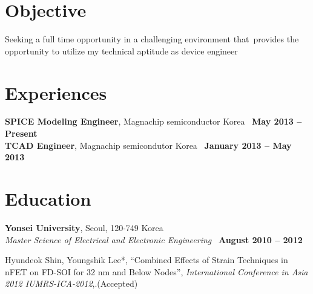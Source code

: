 \documentclass[margin,line]{resume}
\begin{document}
    \begin{resume}

    \section{\mysidestyle Objective}
    Seeking a full time opportunity in a challenging environment that\
    provides the opportunity to utilize my technical aptitude as device engineer 
    \section{\mysidestyle Experiences}

    \textbf{SPICE Modeling Engineer}, Magnachip semiconductor Korea \
    \hfill \textbf{May 2013 -- Present}\vspace{3mm}\\\vspace{-1mm}%
    \textbf{TCAD Engineer}, Magnachip semicondutor Korea \
    \hfill \textbf{January 2013 -- May 2013}\vspace{3mm}\\\vspace{-1mm}%
       
    \section{\mysidestyle Education}

    \textbf{Yonsei University}, Seoul, 120-749 Korea \vspace{2mm}\\\vspace{1mm}%
    \textsl{Master Science of Electrical and Electronic Engineering }\
     \hfill \textbf{August 2010 -- 2012}\vspace{-3mm}\\\vspace{-1mm}%
    
    \vspace{-2mm}
    Hyundeok Shin, Youngshik Lee*,
    ``Combined Effects of Strain Techniques in nFET on FD-SOI for 32 nm and Below Nodes'',
    \textsl{ International Conference in Asia 2012 IUMRS-ICA-2012},.(Accepted)


\end{resume}
\end{document}
